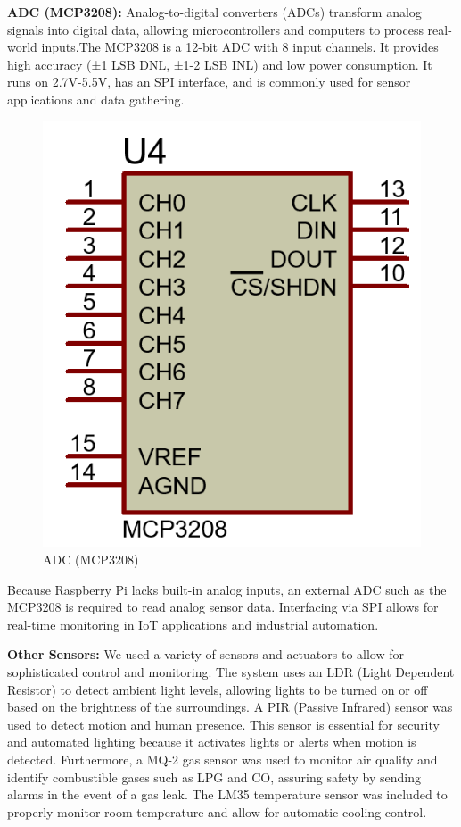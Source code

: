 \documentclass[a4paper,12pt]{report}
\begin{document}
\textbf{ADC (MCP3208):} Analog-to-digital converters (ADCs) transform analog signals into digital data, allowing microcontrollers and computers to process real-world inputs.The MCP3208 is a 12-bit ADC with 8 input channels. It provides high accuracy (±1 LSB DNL, ±1-2 LSB INL) and low power consumption.  It runs on 2.7V-5.5V, has an SPI interface, and is commonly used for sensor applications and data gathering\cite{Dout199927V41}.

\begin{figure}[H]  %
    \centering
    \includegraphics[scale=0.4]{MCP3208.PNG} %
    \caption{ADC (MCP3208)}
    \label{fig:adc} %
\end{figure}

Because Raspberry Pi lacks built-in analog inputs, an external ADC such as the MCP3208 is required to read analog sensor data.  Interfacing via SPI allows for real-time monitoring in IoT applications and industrial automation\cite{Flurry2021}.

\textbf{Other Sensors:} We used a variety of sensors and actuators to allow for sophisticated control and monitoring.  The system uses an LDR (Light Dependent Resistor) to detect ambient light levels, allowing lights to be turned on or off based on the brightness of the surroundings. 
A PIR (Passive Infrared) sensor was used to detect motion and human presence.  This sensor is essential for security and automated lighting because it activates lights or alerts when motion is detected.  Furthermore, a MQ-2 gas sensor was used to monitor air quality and identify combustible gases such as LPG and CO, assuring safety by sending alarms in the event of a gas leak.  The LM35 temperature sensor was included to properly monitor room temperature and allow for automatic cooling control.
\end{document}
